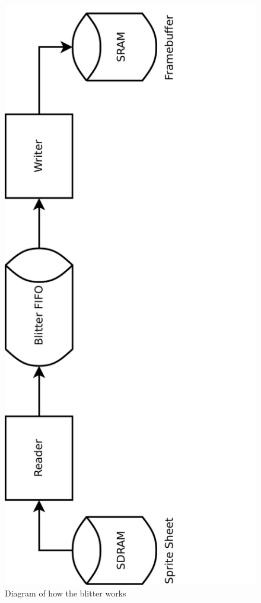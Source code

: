 \documentclass{report}
\begin{document}
\begin{figure}[htb!]
    \begin{center}
        \includegraphics[angle=270,width=4.5in,trim=0 0 1in 0,clip=true]{blitter_process}
    \end{center}
    \caption{Diagram of how the blitter works}
    \label{fig:blitter_process}
\end{figure}
\end{document}
